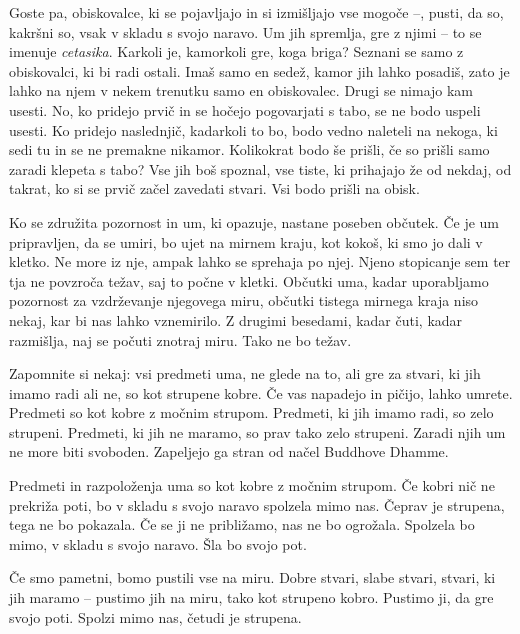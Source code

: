 Goste pa, obiskovalce, ki se pojavljajo in si izmišljajo vse mogoče –, pusti, da so, kakršni so, vsak v skladu s svojo naravo. Um jih spremlja, gre z njimi – to se imenuje \emph{cetasika}. Karkoli je, kamorkoli gre, koga briga? Seznani se samo z obiskovalci, ki bi radi ostali. Imaš samo en sedež, kamor jih lahko posadiš, zato je lahko na njem v nekem trenutku samo en obiskovalec. Drugi se nimajo kam usesti. No, ko pridejo prvič in se hočejo pogovarjati s tabo, se ne bodo uspeli usesti. Ko pridejo naslednjič, kadarkoli to bo, bodo vedno naleteli na nekoga, ki sedi tu in se ne premakne nikamor. Kolikokrat bodo še prišli, če so prišli samo zaradi klepeta s tabo? Vse jih boš spoznal, vse tiste, ki prihajajo že od nekdaj, od takrat, ko si se prvič začel zavedati stvari. Vsi bodo prišli na obisk.

\clearpage


Ko se združita pozornost in um, ki opazuje, nastane poseben občutek. Če je um pripravljen, da se umiri, bo ujet na mirnem kraju, kot kokoš, ki smo jo dali v kletko. Ne more iz nje, ampak lahko se sprehaja po njej. Njeno stopicanje sem ter tja ne povzroča težav, saj to počne v kletki. Občutki uma, kadar uporabljamo pozornost za vzdrževanje njegovega miru, občutki tistega mirnega kraja niso nekaj, kar bi nas lahko vznemirilo. Z drugimi besedami, kadar čuti, kadar razmišlja, naj se počuti znotraj miru. Tako ne bo težav.


Zapomnite si nekaj: vsi predmeti uma, ne glede na to, ali gre za stvari, ki jih imamo radi ali ne, so kot strupene kobre. Če vas napadejo in pičijo, lahko umrete. Predmeti so kot kobre z močnim strupom. Predmeti, ki jih imamo radi, so zelo strupeni. Predmeti, ki jih ne maramo, so prav tako zelo strupeni. Zaradi njih um ne more biti svoboden. Zapeljejo ga stran od načel Buddhove Dhamme.

\clearpage


Predmeti in razpoloženja uma so kot kobre z močnim strupom. Če kobri nič ne prekriža poti, bo v skladu s svojo naravo spolzela mimo nas. Čeprav je strupena, tega ne bo pokazala. Če se ji ne približamo, nas ne bo ogrožala. Spolzela bo mimo, v skladu s svojo naravo. Šla bo svojo pot.

Če smo pametni, bomo pustili vse na miru. Dobre stvari, slabe stvari, stvari, ki jih maramo – pustimo jih na miru, tako kot strupeno kobro. Pustimo ji, da gre svojo poti. Spolzi mimo nas, četudi je strupena.

